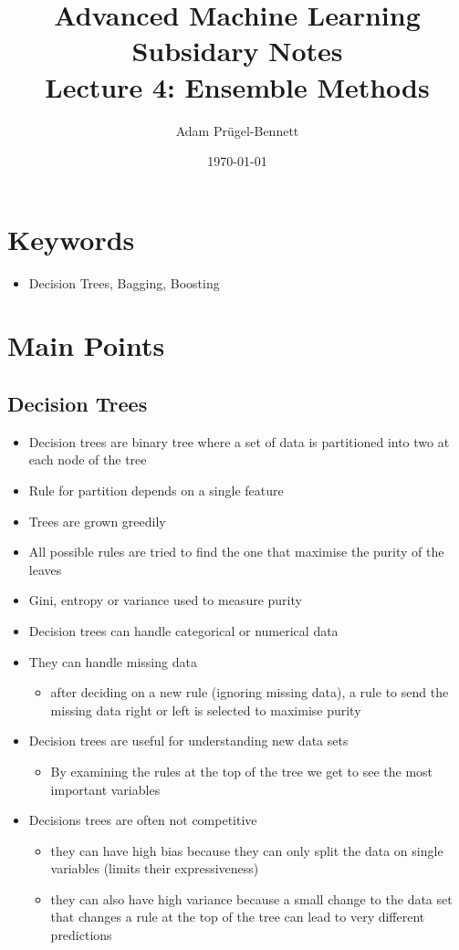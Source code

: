 \documentclass[11pt]{article}
\author{Adam Prügel-Bennett}
\date{\today}
\title{Advanced Machine Learning Subsidary Notes\\\medskip
\large Lecture 4: Ensemble Methods}
\begin{document}
\maketitle

\section{Keywords}
\label{sec:org32a07ed}
\begin{itemize}
\item Decision Trees, Bagging, Boosting
\end{itemize}

\section{Main Points}
\label{sec:orgdb5651d}

\subsection{Decision Trees}
\label{sec:org7ffa9e5}
\begin{itemize}
\item Decision trees are binary tree where a set of data is
partitioned into two at each node of the tree
\item Rule for partition depends on a single feature
\item Trees are grown greedily
\item All possible rules are tried to find the one that maximise the
purity of the leaves
\item Gini, entropy or variance used to measure purity
\item Decision trees can handle categorical or numerical data
\item They can handle missing data
\begin{itemize}
\item after deciding on a new rule (ignoring missing data), a
rule to send the missing data right or left is selected to
maximise purity
\end{itemize}
\item Decision trees are useful for understanding new data sets
\begin{itemize}
\item By examining the rules at the top of the tree we get to see
the most important variables
\end{itemize}
\item Decisions trees are often not competitive
\begin{itemize}
\item they can have high bias because they can only split the data
on single variables (limits their expressiveness)
\item they can also have high variance because a small change to the
data set that changes a rule at the top of the tree can lead
to very different predictions
\end{itemize}
\end{itemize}
\end{document}
